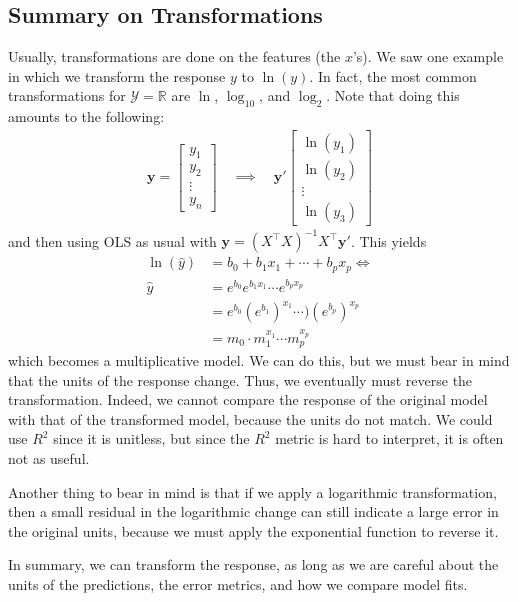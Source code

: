 \documentclass[12pt, a4paper]{article}
\theoremstyle{definition}
\begin{document}
	\subsection*{Summary on Transformations}
	Usually, transformations are done on the features (the $x$'s). We saw one example
	in which we transform the response $y$ to $\ln(y)$. In fact, the
	most common transformations for $\mathcal{Y}=\mathbb{R}$ are $\ln$,
	$\log_{10}$, and $\log_{2}$. Note that doing this amounts to the following:
	\begin{align*}
		\bm{y} = \begin{bmatrix}
			y_1\\
			y_2\\
			\vdots\\
			y_n
		\end{bmatrix}
		\quad
		\implies
		\quad
		\bm{y}'
		\begin{bmatrix}
			\ln(y_1)\\
			\ln(y_2)\\
			\vdots\\
			\ln(y_3)
		\end{bmatrix}
	\end{align*}
	and then using OLS as usual with $\bm{y} = (X^\top X)^{-1}X^\top \bm{y}'$.
	This yields
	\begin{align*}
		\ln(\hat{y})
		&= b_0 + b_1 x_1 + \cdots + b_px_p \iff\\
		\hat{y} &= e^{b_0} e^{b_1x_1}\cdots e^{b_px_p}\\
		&=e^{b_0}(e^{b_1})^{x_1}\cdots )(e^{b_p})^{x_p}\\
		&=m_0\cdot m_1^{x_1}\cdots m_p^{x_p}
	\end{align*}
	which becomes a multiplicative model. We can do this, but we must bear in mind
	that the units of the response change. Thus, we eventually must reverse the
	transformation. Indeed, we cannot compare the response of the original model with
	that of the transformed model, because the units do not match. We could use $R^2$
	since it is unitless, but since the $R^2$ metric is hard to interpret, it
	is often not as useful.
	
	Another thing to bear in mind is that if we apply a logarithmic transformation,
	then a small residual in the logarithmic change can still indicate a large error in
	the original units, because we must apply the exponential function to reverse
	it.
	
	In summary, we can transform the response, as long as we are careful about the units
	of the predictions, the error metrics, and how we compare model fits.
	
\end{document}
